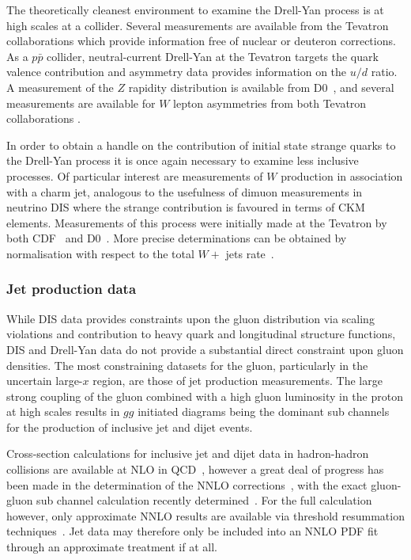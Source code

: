 The theoretically cleanest environment to examine the Drell-Yan process is at high scales at a collider. Several measurements are available from the Tevatron collaborations which provide information free of nuclear or deuteron corrections. As a $p\bar{p}$ collider, neutral-current Drell-Yan at the Tevatron targets the quark valence contribution and asymmetry data provides information on the $u/d$ ratio. A measurement of the $Z$ rapidity distribution  is available from D0~\cite{Abazov:2007jy}, and several measurements are available for $W$ lepton asymmetries from both Tevatron collaborations \cite{Acosta:2005ud,Abazov:2007pm,Abazov:2008qv,Abe:1998rv}.

In order to obtain a handle on the contribution of initial state strange quarks to the Drell-Yan process it is once again necessary to examine less inclusive processes. Of particular interest are measurements of $W$ production in association with a charm jet, analogous to the usefulness of dimuon measurements in neutrino DIS where the strange contribution is favoured in terms of CKM elements. Measurements of this process were initially made at the Tevatron by both CDF~\cite{Aaltonen:2007dm} and D0~\cite{Abazov:2008qz}. More precise determinations can be obtained by normalisation with respect to the total $W+$ jets rate~\cite{Stirling:2012vh}. 

\subsubsection{Jet production data}
While DIS data provides constraints upon the gluon distribution via scaling violations and contribution to heavy quark and longitudinal structure functions, DIS and Drell-Yan data do not provide a substantial direct constraint upon gluon densities. The most constraining datasets for the gluon, particularly in the uncertain large-$x$ region, are those of jet production measurements. The large strong coupling of the gluon combined with a high gluon luminosity in the proton at high scales results in $gg$ initiated diagrams being the dominant sub channels for the production of inclusive jet and dijet events.

Cross-section calculations for inclusive jet and dijet data in hadron-hadron collisions are available at NLO in QCD~\cite{Ellis:1992en,Giele:1994gf,Nagy:2001fj,Nagy:2003tz}, however a great deal of progress has been made in the determination of the NNLO corrections~\cite{Currie:2013dwa,Glover:2001af,Glover:2001rd}, with the exact gluon-gluon sub channel calculation recently determined~\cite{Currie:2013dza}. For the full calculation however, only approximate NNLO results are available via threshold resummation techniques~\cite{deFlorian:2013qia,Kidonakis:2000gi,Kumar:2013hia}. Jet data may therefore only be included into an NNLO PDF fit through an approximate treatment if at all.

